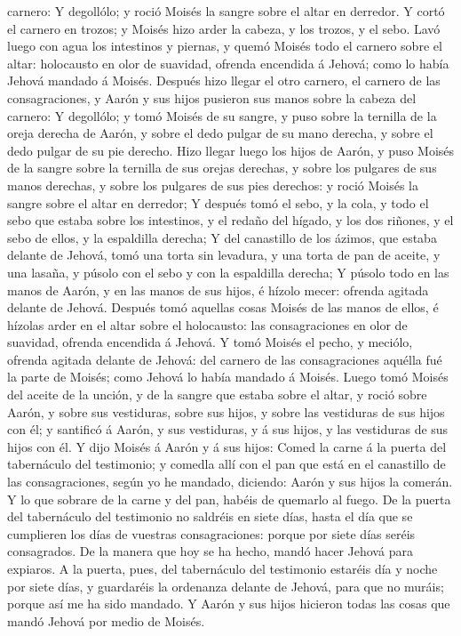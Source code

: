 carnero:  Y degollólo; y roció Moisés la sangre sobre el
altar en derredor.  Y cortó el carnero en trozos; y
Moisés hizo arder la cabeza, y los trozos, y el sebo. 
Lavó luego con agua los intestinos y piernas, y quemó Moisés todo el
carnero sobre el altar: holocausto en olor de suavidad, ofrenda
encendida á Jehová; como lo había Jehová mandado á Moisés.
 Después hizo llegar el otro carnero, el carnero de las
consagraciones, y Aarón y sus hijos pusieron sus manos sobre la cabeza
del carnero:  Y degollólo; y tomó Moisés de su sangre, y
puso sobre la ternilla de la oreja derecha de Aarón, y sobre el dedo
pulgar de su mano derecha, y sobre el dedo pulgar de su pie derecho.
 Hizo llegar luego los hijos de Aarón, y puso Moisés de
la sangre sobre la ternilla de sus orejas derechas, y sobre los pulgares
de sus manos derechas, y sobre los pulgares de sus pies derechos: y
roció Moisés la sangre sobre el altar en derredor;  Y
después tomó el sebo, y la cola, y todo el sebo que estaba sobre los
intestinos, y el redaño del hígado, y los dos riñones, y el sebo de
ellos, y la espaldilla derecha;  Y del canastillo de los
ázimos, que estaba delante de Jehová, tomó una torta sin levadura, y una
torta de pan de aceite, y una lasaña, y púsolo con el sebo y con la
espaldilla derecha;  Y púsolo todo en las manos de Aarón,
y en las manos de sus hijos, é hízolo mecer: ofrenda agitada delante de
Jehová.  Después tomó aquellas cosas Moisés de las manos
de ellos, é hízolas arder en el altar sobre el holocausto: las
consagraciones en olor de suavidad, ofrenda encendida á Jehová.
 Y tomó Moisés el pecho, y meciólo, ofrenda agitada
delante de Jehová: del carnero de las consagraciones aquélla fué la
parte de Moisés; como Jehová lo había mandado á Moisés. 
Luego tomó Moisés del aceite de la unción, y de la sangre que estaba
sobre el altar, y roció sobre Aarón, y sobre sus vestiduras, sobre sus
hijos, y sobre las vestiduras de sus hijos con él; y santificó á Aarón,
y sus vestiduras, y á sus hijos, y las vestiduras de sus hijos con él.
 Y dijo Moisés á Aarón y á sus hijos: Comed la carne á la
puerta del tabernáculo del testimonio; y comedla allí con el pan que
está en el canastillo de las consagraciones, según yo he mandado,
diciendo: Aarón y sus hijos la comerán.  Y lo que sobrare
de la carne y del pan, habéis de quemarlo al fuego.  De
la puerta del tabernáculo del testimonio no saldréis en siete días,
hasta el día que se cumplieren los días de vuestras consagraciones:
porque por siete días seréis consagrados.  De la manera
que hoy se ha hecho, mandó hacer Jehová para expiaros.  A
la puerta, pues, del tabernáculo del testimonio estaréis día y noche por
siete días, y guardaréis la ordenanza delante de Jehová, para que no
muráis; porque así me ha sido mandado.  Y Aarón y sus
hijos hicieron todas las cosas que mandó Jehová por medio de Moisés.

